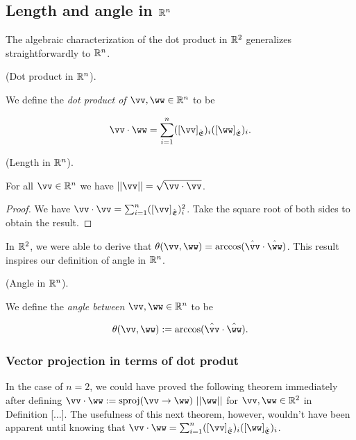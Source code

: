 \subsection*{Length and angle in $\mathbb{R}^n$}

The algebraic characterization of the dot product in $\mathbb{R}^2$ generalizes straightforwardly to $\mathbb{R}^n$.

\begin{defn}
    (Dot product in $\mathbb{R}^n$).

    We define the \textit{dot product of $\vv, \ww \in \R^n$} to be

    \begin{align*}
        \vv \cdot \ww = \sum_{i = 1}^n ([\vv]_\sE)_i ([\ww]_\sE)_i.
    \end{align*}
\end{defn}

\begin{theorem}
    (Length in $\mathbb{R}^n$).

    For all $\vv \in \R^n$ we have $||\vv|| = \sqrt{\vv \cdot \vv}$.
\end{theorem}

\begin{proof}
    We have $\vv \cdot \vv = \sum_{i = 1}^n ([\vv]_\sE)_i^2$. Take the square root of both sides to obtain the result.
\end{proof}

In $\mathbb{R}^2$, we were able to derive that $\theta(\vv, \ww) = \arccos(\hvv \cdot \hww)$. This result inspires our definition of angle in $\mathbb{R}^n$.

\begin{defn}
    (Angle in $\mathbb{R}^n$). 
    
    We define the \textit{angle between $\vv, \ww \in \R^n$} to be

    \begin{align*}
        \theta(\vv, \ww) := \arccos(\hvv \cdot \hww).
    \end{align*}
\end{defn}

\subsubsection*{Vector projection in terms of dot produt}

In the case of $n = 2$, we could have proved the following theorem immediately after defining $\vv \cdot \ww := \sproj(\vv \rightarrow \ww) \spc ||\ww||$ for $\vv, \ww \in \R^2$ in Definition [...]. The usefulness of this next theorem, however, wouldn't have been apparent until knowing that $\vv \cdot \ww = \sum_{i = 1}^n ([\vv]_\sE)_i ([\ww]_\sE)_i$.

